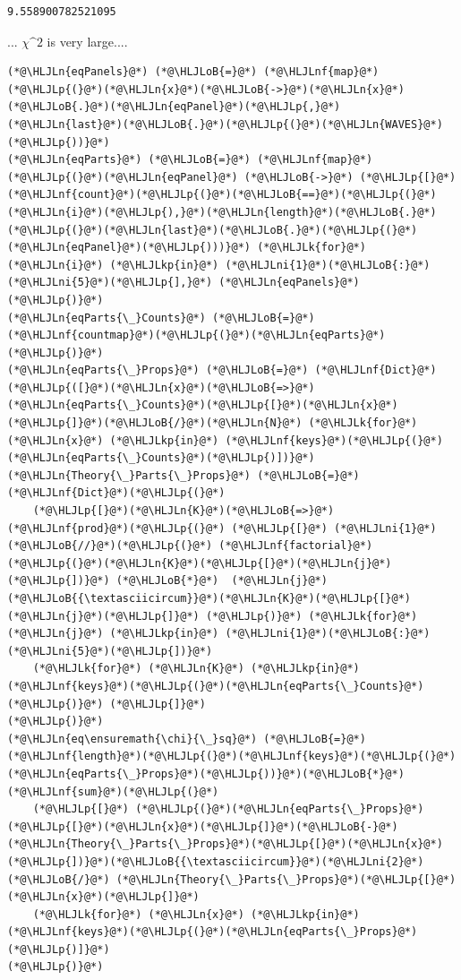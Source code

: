 \documentclass[12pt,a4paper]{article}
\newcommand{\HLJLk}[1]{\textcolor[RGB]{148,91,176}{\textbf{#1}}}
\newcommand{\HLJLkp}[1]{\textcolor[RGB]{148,91,176}{\textbf{#1}}}
\newcommand{\HLJLn}[1]{#1}
\newcommand{\HLJLnf}[1]{\textcolor[RGB]{66,102,213}{#1}}
\newcommand{\HLJLni}[1]{\textcolor[RGB]{59,151,46}{#1}}
\newcommand{\HLJLoB}[1]{\textcolor[RGB]{102,102,102}{\textbf{#1}}}
\newcommand{\HLJLp}[1]{#1}
\begin{document}
\begin{lstlisting}
9.558900782521095
\end{lstlisting}


... \ensuremath{\chi}\ensuremath{\^2} is very large....


\begin{lstlisting}
(*@\HLJLn{eqPanels}@*) (*@\HLJLoB{=}@*) (*@\HLJLnf{map}@*)(*@\HLJLp{(}@*)(*@\HLJLn{x}@*)(*@\HLJLoB{->}@*)(*@\HLJLn{x}@*)(*@\HLJLoB{.}@*)(*@\HLJLn{eqPanel}@*)(*@\HLJLp{,}@*) (*@\HLJLn{last}@*)(*@\HLJLoB{.}@*)(*@\HLJLp{(}@*)(*@\HLJLn{WAVES}@*)(*@\HLJLp{))}@*)
(*@\HLJLn{eqParts}@*) (*@\HLJLoB{=}@*) (*@\HLJLnf{map}@*)(*@\HLJLp{(}@*)(*@\HLJLn{eqPanel}@*) (*@\HLJLoB{->}@*) (*@\HLJLp{[}@*)(*@\HLJLnf{count}@*)(*@\HLJLp{(}@*)(*@\HLJLoB{==}@*)(*@\HLJLp{(}@*)(*@\HLJLn{i}@*)(*@\HLJLp{),}@*)(*@\HLJLn{length}@*)(*@\HLJLoB{.}@*)(*@\HLJLp{(}@*)(*@\HLJLn{last}@*)(*@\HLJLoB{.}@*)(*@\HLJLp{(}@*)(*@\HLJLn{eqPanel}@*)(*@\HLJLp{)))}@*) (*@\HLJLk{for}@*) (*@\HLJLn{i}@*) (*@\HLJLkp{in}@*) (*@\HLJLni{1}@*)(*@\HLJLoB{:}@*)(*@\HLJLni{5}@*)(*@\HLJLp{],}@*) (*@\HLJLn{eqPanels}@*) (*@\HLJLp{)}@*)
(*@\HLJLn{eqParts{\_}Counts}@*) (*@\HLJLoB{=}@*) (*@\HLJLnf{countmap}@*)(*@\HLJLp{(}@*)(*@\HLJLn{eqParts}@*)(*@\HLJLp{)}@*)
(*@\HLJLn{eqParts{\_}Props}@*) (*@\HLJLoB{=}@*) (*@\HLJLnf{Dict}@*)(*@\HLJLp{([}@*)(*@\HLJLn{x}@*)(*@\HLJLoB{=>}@*)(*@\HLJLn{eqParts{\_}Counts}@*)(*@\HLJLp{[}@*)(*@\HLJLn{x}@*)(*@\HLJLp{]}@*)(*@\HLJLoB{/}@*)(*@\HLJLn{N}@*) (*@\HLJLk{for}@*) (*@\HLJLn{x}@*) (*@\HLJLkp{in}@*) (*@\HLJLnf{keys}@*)(*@\HLJLp{(}@*)(*@\HLJLn{eqParts{\_}Counts}@*)(*@\HLJLp{)])}@*)
(*@\HLJLn{Theory{\_}Parts{\_}Props}@*) (*@\HLJLoB{=}@*) (*@\HLJLnf{Dict}@*)(*@\HLJLp{(}@*)
	(*@\HLJLp{[}@*)(*@\HLJLn{K}@*)(*@\HLJLoB{=>}@*) (*@\HLJLnf{prod}@*)(*@\HLJLp{(}@*) (*@\HLJLp{[}@*) (*@\HLJLni{1}@*)(*@\HLJLoB{//}@*)(*@\HLJLp{(}@*) (*@\HLJLnf{factorial}@*)(*@\HLJLp{(}@*)(*@\HLJLn{K}@*)(*@\HLJLp{[}@*)(*@\HLJLn{j}@*)(*@\HLJLp{])}@*) (*@\HLJLoB{*}@*)  (*@\HLJLn{j}@*)(*@\HLJLoB{{\textasciicircum}}@*)(*@\HLJLn{K}@*)(*@\HLJLp{[}@*)(*@\HLJLn{j}@*)(*@\HLJLp{]}@*) (*@\HLJLp{)}@*) (*@\HLJLk{for}@*) (*@\HLJLn{j}@*) (*@\HLJLkp{in}@*) (*@\HLJLni{1}@*)(*@\HLJLoB{:}@*)(*@\HLJLni{5}@*)(*@\HLJLp{])}@*) 
	(*@\HLJLk{for}@*) (*@\HLJLn{K}@*) (*@\HLJLkp{in}@*) (*@\HLJLnf{keys}@*)(*@\HLJLp{(}@*)(*@\HLJLn{eqParts{\_}Counts}@*)(*@\HLJLp{)}@*) (*@\HLJLp{]}@*)
(*@\HLJLp{)}@*)
(*@\HLJLn{eq\ensuremath{\chi}{\_}sq}@*) (*@\HLJLoB{=}@*) (*@\HLJLnf{length}@*)(*@\HLJLp{(}@*)(*@\HLJLnf{keys}@*)(*@\HLJLp{(}@*)(*@\HLJLn{eqParts{\_}Props}@*)(*@\HLJLp{))}@*)(*@\HLJLoB{*}@*)(*@\HLJLnf{sum}@*)(*@\HLJLp{(}@*)
	(*@\HLJLp{[}@*) (*@\HLJLp{(}@*)(*@\HLJLn{eqParts{\_}Props}@*)(*@\HLJLp{[}@*)(*@\HLJLn{x}@*)(*@\HLJLp{]}@*)(*@\HLJLoB{-}@*)(*@\HLJLn{Theory{\_}Parts{\_}Props}@*)(*@\HLJLp{[}@*)(*@\HLJLn{x}@*)(*@\HLJLp{])}@*)(*@\HLJLoB{{\textasciicircum}}@*)(*@\HLJLni{2}@*) (*@\HLJLoB{/}@*) (*@\HLJLn{Theory{\_}Parts{\_}Props}@*)(*@\HLJLp{[}@*)(*@\HLJLn{x}@*)(*@\HLJLp{]}@*)
	(*@\HLJLk{for}@*) (*@\HLJLn{x}@*) (*@\HLJLkp{in}@*) (*@\HLJLnf{keys}@*)(*@\HLJLp{(}@*)(*@\HLJLn{eqParts{\_}Props}@*)(*@\HLJLp{)]}@*)
(*@\HLJLp{)}@*)
\end{lstlisting}
\end{document}
